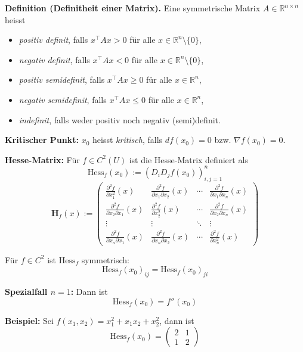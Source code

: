 \textbf{Definition (Definitheit einer Matrix).} Eine symmetrische Matrix \( A \in \mathbb{R}^{n \times n} \) heisst
\begin{itemize}
  \item \textit{positiv definit}, falls \( x^\top A x > 0 \) für alle \( x \in \mathbb{R}^n \setminus \{0\} \),
  \item \textit{negativ definit}, falls \( x^\top A x < 0 \) für alle \( x \in \mathbb{R}^n \setminus \{0\} \),
  \item \textit{positiv semidefinit}, falls \( x^\top A x \geq 0 \) für alle \( x \in \mathbb{R}^n \),
  \item \textit{negativ semidefinit}, falls \( x^\top A x \leq 0 \) für alle \( x \in \mathbb{R}^n \),
  \item \textit{indefinit}, falls weder positiv noch negativ (semi)definit.
\end{itemize}


\textbf{Kritischer Punkt:} $x_0$ heisst \textit{kritisch}, falls $df(x_0) = 0$ bzw. $\nabla f(x_0) = 0$.

\textbf{Hesse-Matrix:} Für $f \in C^2(U)$ ist die Hesse-Matrix definiert als
\[
\text{Hess}_f(x_0) := \left(D_i D_j f(x_0)\right)_{i,j=1}^n
\]
{\small
\[
\mathbf{H}_f(x) :=
\begin{pmatrix}
\frac{\partial^2 f}{\partial x_1^2}(x) & \frac{\partial^2 f}{\partial x_1 \partial x_2}(x) & \cdots & \frac{\partial^2 f}{\partial x_1 \partial x_n}(x) \\
\frac{\partial^2 f}{\partial x_2 \partial x_1}(x) & \frac{\partial^2 f}{\partial x_2^2}(x) & \cdots & \frac{\partial^2 f}{\partial x_2 \partial x_n}(x) \\
\vdots & \vdots & \ddots & \vdots \\
\frac{\partial^2 f}{\partial x_n \partial x_1}(x) & \frac{\partial^2 f}{\partial x_n \partial x_2}(x) & \cdots & \frac{\partial^2 f}{\partial x_n^2}(x)
\end{pmatrix}
\]
}


Für $f \in C^2$ ist $\text{Hess}_f$ symmetrisch:
\[
\text{Hess}_f(x_0)_{ij} = \text{Hess}_f(x_0)_{ji}
\]

\textbf{Spezialfall $n = 1$:} Dann ist
\[
\text{Hess}_f(x_0) = f''(x_0)
\]

\textbf{Beispiel:} Sei $f(x_1, x_2) = x_1^2 + x_1 x_2 + x_2^2$, dann ist
\[
\text{Hess}_f(x_0) = 
\begin{pmatrix}
2 & 1 \\
1 & 2
\end{pmatrix}
\]

